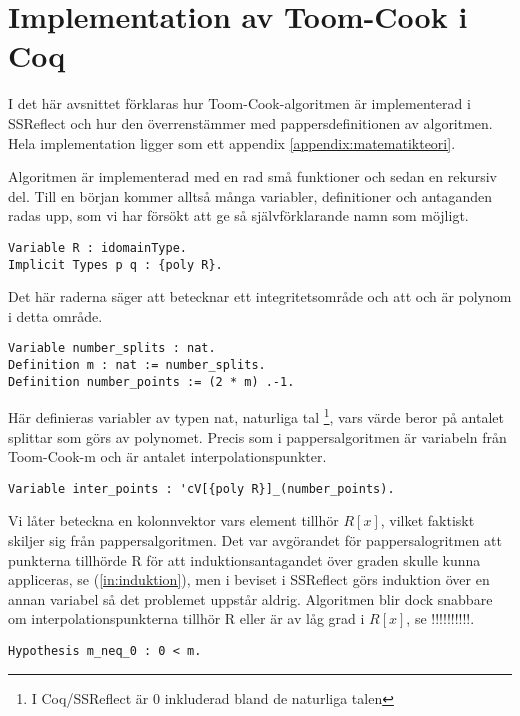 \section{Implementation av Toom-Cook i Coq}
\label{sec:formellimplementation}
I det här avsnittet förklaras hur Toom-Cook-algoritmen är implementerad i
SSReflect och hur den överrenstämmer med pappersdefinitionen av algoritmen.
Hela implementation ligger som ett appendix \ref{appendix:matematikteori}.

Algoritmen är implementerad med en rad små funktioner och sedan en rekursiv
del. Till en början kommer alltså många variabler, definitioner och antaganden
radas upp, som vi har försökt att ge så självförklarande namn som möjligt.

\begin{lstlisting}
Variable R : idomainType.
Implicit Types p q : {poly R}.
\end{lstlisting}

Det här raderna säger att  betecknar ett integritetsområde och att 
och  är polynom i detta område.

\begin{lstlisting}
Variable number_splits : nat.
Definition m : nat := number_splits.
Definition number_points := (2 * m) .-1.
\end{lstlisting}

Här definieras variabler av typen nat, naturliga tal \footnote{I Coq/SSReflect
är 0 inkluderad bland de naturliga talen}, vars värde beror på antalet splittar
som görs av polynomet. Precis som i pappersalgoritmen är  variabeln från
Toom-Cook-m och  är antalet interpolationspunkter.

\begin{lstlisting}
Variable inter_points : 'cV[{poly R}]_(number_points).
\end{lstlisting}

Vi låter  beteckna en kolonnvektor vars element tillhör $R[x]$,
vilket faktiskt skiljer sig från pappersalgoritmen. Det var avgörandet för
pappersalogritmen att punkterna tillhörde R för att induktionsantagandet över
graden skulle kunna appliceras, se (\ref{in:induktion}), men i beviset i
SSReflect görs induktion över en annan variabel så det problemet uppstår
aldrig. Algoritmen blir dock snabbare om interpolationspunkterna tillhör R
eller är av låg grad i $R[x]$, se !!!!!!!!!!.

\begin{lstlisting}
Hypothesis m_neq_0 : 0 < m.
\end{lstlisting}

